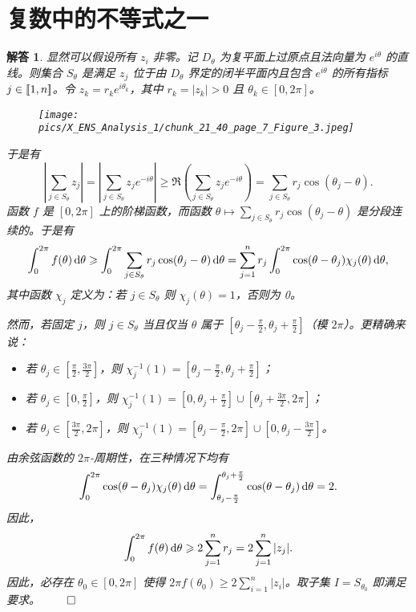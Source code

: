 \documentclass[12pt,UTF8]{ctexbook}
\theoremstyle{exercisestyle}
\theoremstyle{solutionstyle}
\newtheorem*{solution*}{解答}
\newenvironment{solution}
  {\begin{solution*}}
  {\hfill\ensuremath{\qed}\end{solution*}}
\begin{document}
\section{复数中的不等式之一}
\begin{solution}
显然可以假设所有 \( z_i \) 非零。记 \( D_{\theta} \) 为复平面上过原点且法向量为 \( e^{i\theta} \) 的直线。则集合 \( S_{\theta} \) 是满足 \( z_j \) 位于由 \( D_{\theta} \) 界定的闭半平面内且包含 \( e^{i\theta} \) 的所有指标 \( j \in [\![1,n]\!] \)。令 \( z_k = r_k e^{i\theta_k} \)，其中 \( r_k = |z_k| > 0 \) 且 \( \theta_k \in [0, 2\pi] \)。
\begin{figure}[htbp]
    \centering
    \texttt{[image: pics/X\_ENS\_Analysis\_1/chunk\_21\_40\_page\_7\_Figure\_3.jpeg]}
\end{figure}
于是有
\[
\left| \sum_{j \in S_{\theta}} z_j \right| = \left| \sum_{j \in S_{\theta}} z_j e^{-i\theta} \right| \geqslant \Re \left( \sum_{j \in S_{\theta}} z_j e^{-i\theta} \right) = \sum_{j \in S_{\theta}} r_j \cos(\theta_j - \theta).
\]
函数 \( f \) 是 \([0, 2\pi]\) 上的阶梯函数，而函数 \(\theta \mapsto \sum_{j \in S_{\theta}} r_j \cos(\theta_j - \theta)\) 是分段连续的。于是有
\[
\int_0^{2\pi} f(\theta) \,\mathrm{d}\theta \geqslant \int_0^{2\pi} \sum_{j \in S_{\theta}} r_j \cos(\theta_j - \theta) \,\mathrm{d}\theta = \sum_{j=1}^n r_j \int_0^{2\pi} \cos(\theta - \theta_j) \chi_j(\theta) \,\mathrm{d}\theta,
\]
其中函数 \(\chi_j\) 定义为：若 \( j \in S_\theta \) 则 \(\chi_j(\theta) = 1\)，否则为 0。

然而，若固定 \( j \)，则 \( j \in S_\theta \) 当且仅当 \(\theta\) 属于 \(\left[\theta_j - \frac{\pi}{2}, \theta_j + \frac{\pi}{2}\right]\)（模 \(2\pi\)）。更精确来说：
\begin{itemize}
    \item 若 \(\theta_j \in \left[\frac{\pi}{2}, \frac{3\pi}{2}\right]\)，则 \(\chi_j^{-1}(1) = \left[\theta_j - \frac{\pi}{2}, \theta_j + \frac{\pi}{2}\right]\)；
    \item 若 \(\theta_j \in \left[0, \frac{\pi}{2}\right]\)，则 \(\chi_j^{-1}(1) = \left[0, \theta_j + \frac{\pi}{2}\right] \cup \left[\theta_j + \frac{3\pi}{2}, 2\pi\right]\)；
    \item 若 \(\theta_j \in \left[\frac{3\pi}{2}, 2\pi\right]\)，则 \(\chi_j^{-1}(1) = \left[\theta_j - \frac{\pi}{2}, 2\pi\right] \cup \left[0, \theta_j - \frac{3\pi}{2}\right]\)。
\end{itemize}

由余弦函数的 \(2\pi\)-周期性，在三种情况下均有
\[
\int_0^{2\pi} \cos(\theta - \theta_j) \chi_j(\theta) \,\mathrm{d}\theta = \int_{\theta_j - \frac{\pi}{2}}^{\theta_j + \frac{\pi}{2}} \cos(\theta - \theta_j) \,\mathrm{d}\theta = 2.
\]
因此，
\[
\int_0^{2\pi} f(\theta) \,\mathrm{d}\theta \geqslant 2 \sum_{j=1}^n r_j = 2 \sum_{j=1}^n |z_j|.
\]
因此，必存在 \(\theta_0 \in [0, 2\pi]\) 使得 \( 2\pi f(\theta_0) \geqslant 2 \sum_{i=1}^n |z_i| \)。取子集 \( I = S_{\theta_0} \) 即满足要求。
\end{solution}
\end{document}
